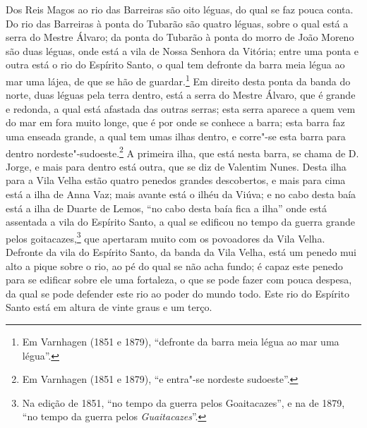 Dos Reis Magos ao rio das Barreiras são oito léguas, do qual se faz pouca conta. Do rio
das Barreiras à ponta do Tubarão são quatro léguas, sobre o qual está a serra do Mestre
Álvaro; da ponta do Tubarão à ponta do morro de João Moreno são duas léguas, onde está a
vila de Nossa Senhora da Vitória; entre uma ponta e outra está o rio do Espírito Santo, o
qual tem defronte da barra meia légua ao mar uma lájea, de que se hão de
guardar.\footnote{ Em Varnhagen (1851 e 1879), ``defronte da barra meia légua ao mar uma
légua''.} Em direito desta ponta da banda do norte, duas léguas pela terra dentro, está a
serra do Mestre Álvaro, que é grande e redonda, a qual está afastada das outras serras;
esta serra aparece a quem vem do mar em fora muito longe, que é por onde se conhece a
barra; esta barra faz uma enseada grande, a qual tem umas ilhas dentro, e corre"-se esta
barra para dentro nordeste"-sudoeste.\footnote{ Em Varnhagen (1851 e 1879), ``e entra"-se
nordeste sudoeste''.} A primeira ilha, que está nesta barra, se chama de D. Jorge, e mais
para dentro está outra, que se diz de Valentim Nunes. Desta ilha para a Vila Velha estão
quatro penedos grandes descobertos, e mais para cima está a ilha de Anna Vaz; mais avante
está o ilhéu da Viúva; e no cabo desta baía está a ilha de Duarte de Lemos, ``no cabo
desta baía fica a ilha'' onde está assentada a vila do Espírito Santo, a qual se edificou
no tempo da guerra grande pelos goitacazes,\footnote{ Na edição de 1851, ``no tempo da
guerra pelos Goaitacazes'', e na de 1879, ``no tempo da guerra pelos
\textit{Guaitacazes}''.} que apertaram muito com os povoadores da Vila Velha. Defronte da
vila do Espírito Santo, da banda da Vila Velha, está um penedo mui alto a pique sobre o
rio, ao pé do qual se não acha fundo; é capaz este penedo para se edificar sobre ele uma
fortaleza, o que se pode fazer com pouca despesa, da qual se pode defender este rio ao
poder do mundo todo. Este rio do Espírito Santo está em altura de vinte graus e um terço.

